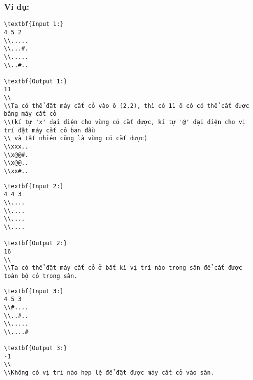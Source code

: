 \subsubsection{   Ví dụ:  }
\begin{verbatim}
\textbf{Input 1:}
4 5 2
\\.....
\\...#.
\\.....
\\..#..

\textbf{Output 1:}
11
\\
\\Ta có thể đặt máy cắt cỏ vào ô (2,2), thì có 11 ô có có thể cắt được bằng máy cắt cỏ
\\(kí tự 'x' đại diện cho vùng cỏ cắt được, kí tự '@' đại diện cho vị trí đặt máy cắt cỏ ban đầu
\\ và tất nhiên cũng là vùng cỏ cắt được)
\\xxx..
\\x@@#.
\\x@@..
\\xx#..\end{verbatim}
\begin{verbatim}
\textbf{Input 2:}
4 4 3
\\....
\\....
\\....
\\....

\textbf{Output 2:}
16
\\
\\Ta có thể đặt máy cắt cỏ ở bất kì vị trí nào trong sân để cắt được toàn bộ cỏ trong sân.\end{verbatim}
\begin{verbatim}
\textbf{Input 3:}
4 5 3
\\#....
\\..#..
\\.....
\\....#

\textbf{Output 3:}
-1
\\
\\Không có vị trí nào hợp lệ để đặt được máy cắt cỏ vào sân.\end{verbatim}